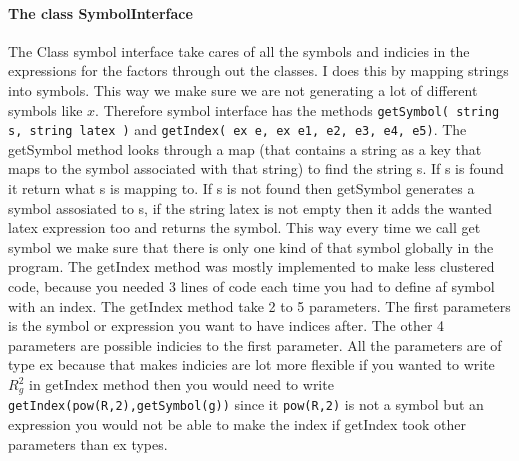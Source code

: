      \paragraph{The class SymbolInterface} The Class symbol interface take cares of all the symbols and indicies in the expressions for the factors through out the classes. I does this by mapping strings into symbols. This way we make sure we are not generating a lot of different symbols like $x$. Therefore symbol interface has the methods \texttt{getSymbol( string s, string latex )} and \texttt{getIndex( ex e, ex e1, e2, e3, e4, e5)}. The getSymbol method looks through a map (that contains a string as a key that maps to the symbol associated with that string) to find the string s. If s is found it return what s is mapping to. If s is not found then getSymbol generates a symbol assosiated to s, if the string latex is not empty then it adds the wanted latex expression too and returns the symbol. This way every time we call get symbol we make sure that there is only one kind of that symbol globally in the program. The getIndex method was mostly implemented to make less clustered code, because you needed 3 lines of code each time you had to define af symbol with an index. The getIndex method take 2 to 5 parameters. The first parameters is the symbol or expression you want to have indices after. The other 4 parameters are possible indicies to the first parameter. All the parameters are of type ex because that makes indicies are lot more flexible if you wanted to write $R_g^2$ in getIndex method then you would need to write \texttt{getIndex(pow(R,2),getSymbol(g))} since it \texttt{pow(R,2)} is not a symbol but an expression you would not be able to make the index if getIndex took other parameters than ex types.

